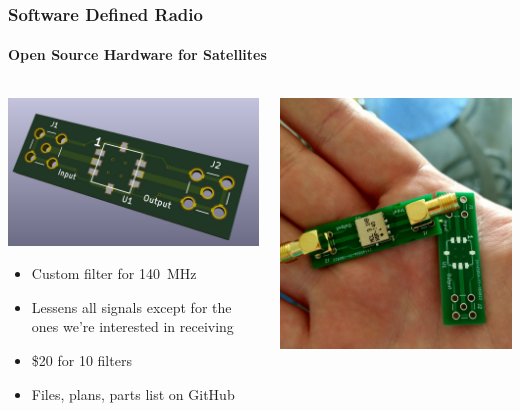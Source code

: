 \documentclass[]{beamer}
\begin{document}
\begin{frame}
    \frametitle{Software Defined Radio}
    \framesubtitle{Open Source Hardware for Satellites}
    \begin{columns}[T]
        \begin{column}[T]{5cm}
            \includegraphics[width=0.45\paperwidth,keepaspectratio]{images/140-bpf-cad.jpg}
            \begin{footnotesize}
                \begin{itemize}
                    \item Custom filter for 140~MHz
                    \item Lessens all signals except for the ones we're interested in receiving
                    \item \$20 for 10 filters
                    \item Files, plans, parts list on GitHub
                \end{itemize}
            \end{footnotesize}
        \end{column}
        \begin{column}[T]{5cm}
            \includegraphics[height=0.70\paperheight]{images/140-bpf-irl.jpg}

\end{column}
\end{columns}
\end{frame}
\end{document}

